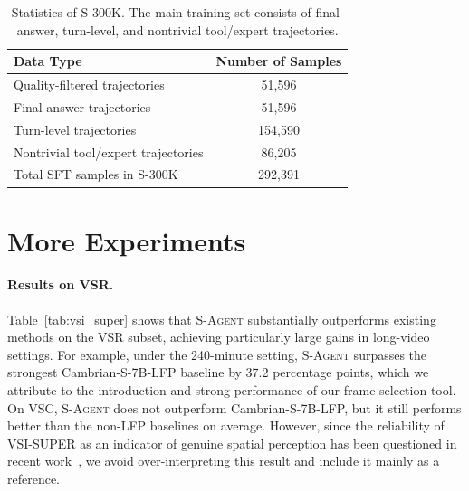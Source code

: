 \documentclass{llmxive}
\begin{document}
\begin{table}[!htbp]
\centering
\small
\begin{tabular}{lc}
\toprule
\textbf{Data Type} & \textbf{Number of Samples} \\
\midrule
Quality-filtered trajectories & 51,596 \\
\midrule
Final-answer trajectories & 51,596 \\
Turn-level trajectories & 154,590 \\
Nontrivial tool/expert trajectories & 86,205 \\
\midrule
Total SFT samples in \textsc{S-300K} & 292,391 \\
\bottomrule
\end{tabular}
\vspace{0.2cm}
\caption{Statistics of \textsc{S-300K}. The main training set consists of final-answer, turn-level, and nontrivial tool/expert trajectories.}
\label{tab:s300k_statistics}
\end{table}



\section{More Experiments}
\label{app:more_experiments}

\paragraph{Results on VSR.}
Table~\ref{tab:vsi_super} shows that \textsc{S-Agent} substantially outperforms existing methods on the VSR subset, achieving particularly large gains in long-video settings. 
For example, under the 240-minute setting, \textsc{S-Agent} surpasses the strongest Cambrian-S-7B-LFP baseline by 37.2 percentage points, which we attribute to the introduction and strong performance of our frame-selection tool. 
On VSC, \textsc{S-Agent} does not outperform Cambrian-S-7B-LFP, but it still performs better than the non-LFP baselines on average.
However, since the reliability of VSI-SUPER as an indicator of genuine spatial perception has been questioned in recent work~\citep{udandarao2025solving}, we avoid over-interpreting this result and include it mainly as a reference.
\end{document}
